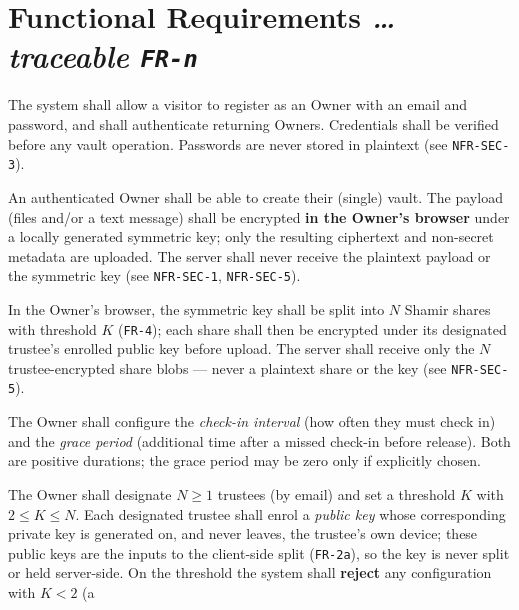 \documentclass[11pt,a4paper]{article}
\newcommand{\BvrHint}[1]{%
  {\normalfont\normalsize\itshape\hfill #1}}
\newcommand{\ReqID}[1]{\texttt{#1}}
\begin{document}
\section{Functional Requirements
  \BvrHint{\ldots traceable \ReqID{FR-\textit{n}}}}
\begin{description}[leftmargin=0cm,style=nextline]
  \item[\ReqID{FR-1} Registration \& authentication.] The system shall allow a
    visitor to register as an Owner with an email and password, and shall
    authenticate returning Owners. Credentials shall be verified before any
    vault operation. Passwords are never stored in plaintext (see
    \ReqID{NFR-SEC-3}).
  \item[\ReqID{FR-2} Vault creation \& client-side payload encryption.] An
    authenticated Owner shall be able to create their (single) vault. The
    payload (files and/or a text message) shall be encrypted \textbf{in the
    Owner's browser} under a locally generated symmetric key; only the resulting
    ciphertext and non-secret metadata are uploaded. The server shall never
    receive the plaintext payload or the symmetric key (see \ReqID{NFR-SEC-1},
    \ReqID{NFR-SEC-5}).
  \item[\ReqID{FR-2a} Client-side key splitting \& share encryption.] In the
    Owner's browser, the symmetric key shall be split into $N$ Shamir shares
    with threshold $K$ (\ReqID{FR-4}); each share shall then be encrypted under
    its designated trustee's enrolled public key before upload. The server shall
    receive only the $N$ trustee-encrypted share blobs --- never a plaintext
    share or the key (see \ReqID{NFR-SEC-5}).
  \item[\ReqID{FR-3} Timing configuration.] The Owner shall configure the
    \emph{check-in interval} (how often they must check in) and the
    \emph{grace period} (additional time after a missed check-in before
    release). Both are positive durations; the grace period may be zero only
    if explicitly chosen.
  \item[\ReqID{FR-4} Trustee designation, enrolment \& threshold.] The Owner
    shall designate $N \ge 1$ trustees (by email) and set a threshold $K$ with
    $2 \le K \le N$. Each designated trustee shall enrol a \emph{public key}
    whose corresponding private key is generated on, and never leaves, the
    trustee's own device; these public keys are the inputs to the client-side
    split (\ReqID{FR-2a}), so the key is never split or held server-side. On the
    threshold the system shall \textbf{reject} any configuration with $K < 2$ (a

\end{description}
\end{document}
